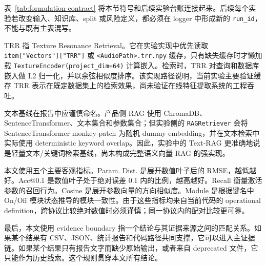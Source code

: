 \begin{table}[H]
	\centering
	\caption{检索式可编辑参数控制的 formal contract。}
	\label{tab:formulation-contract}
	\small
\end{table}

表~\ref{tab:formulation-contract} 将本节符号和后续实验台账连接起来。后续每个实验若改变输入、知识库、split 或风险定义，都必须在 logger 中形成新的 \texttt{run\_id}，不能与既有主表混写。

TRR 指 Texture Resonance Retrieval。它在实验实现中优先读取 \texttt{item["Vectors"]["TRR"]} 或 \texttt{<AudioPath>.trr.npy} 缓存，只有缺失缓存时才懒加载 \texttt{TextureEncoder(project\_dim=64)} 计算嵌入。检索时，TRR 对查询和数据库嵌入做 L2 归一化，并以余弦相似度排序。该实现路径说明，当前实验主要验证缓存 TRR 表示在既定数据集上的检索效果，尚未验证在线特征提取系统的工程吞吐。

文本基线在报告中应谨慎命名。产品侧 RAG 使用 ChromaDB、SentenceTransformer、文本集合和参数集合；但实验侧的 \texttt{RAGRetriever} 会将 SentenceTransformer monkey-patch 为随机 dummy embedding，并在文本检索中实际使用 deterministic keyword overlap。因此，实验中的 Text-RAG 更准确地说是轻量文本/关键词检索基线，尚未构成完整语义向量 RAG 的强实现。

本文使用五个主要客观指标。Param. Dist. 是展开数值叶子后的 RMSE，越低越好。Acc@0.1 是数值叶子处于绝对误差 0.1 内的比例，越高越好。Recall 衡量激活参数的召回行为。Cosine 是展开参数向量的方向相似度。Module 是根据键名中 On/Off 模块状态推导的模块一致性。由于这些指标均来自当前代码的 operational definition，跨协议比较绝对数值时必须谨慎；同一协议内的配对比较更可靠。

最后，本文使用 evidence boundary 指一个结论与其证据来源之间的匹配关系。如果某个结果有 CSV、JSON、统计报告和代码路径共同支撑，它可以进入主证据链。如果某个结果只有报告文字而缺少原始输出，或者来自 deprecated 文件，它只能作为历史线索。这个规则贯穿本文所有结论。
